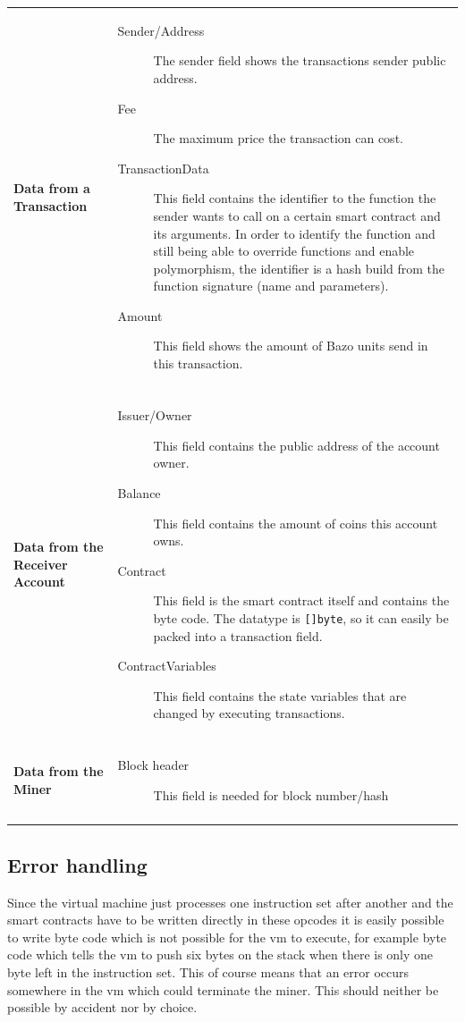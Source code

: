 \begin{tabular}[t]{ p{3cm} p{12.5cm}}
\raggedright
\textbf{Data from a Transaction} &
\begin{description}
  \item[Sender/Address] The sender field shows the transactions sender public address.
  \item[Fee] The maximum price the transaction can cost.
  \item[TransactionData] This field contains the identifier to the function the sender wants to call on a certain smart contract and its arguments. In order to identify the function and still being able to override functions and enable polymorphism, the identifier is a hash build from the function signature (name and parameters).
  \item[Amount] This field shows the amount of Bazo units send in this transaction.
\end{description} \\ \\

\raggedright
\textbf{Data from the Receiver Account} &
\begin{description}
  \item[Issuer/Owner] This field contains the public address of the account owner.
  \item[Balance] This field contains the amount of coins this account owns.
  \item[Contract] This field is the smart contract itself and contains the byte code. The datatype is \texttt{[]byte}, so it can easily be packed into a transaction field.
  \item[ContractVariables] This field contains the state variables that are changed by executing transactions.
\end{description} \\ \\

\raggedright
\textbf{Data from the Miner} &
\begin{description}
  \item[Block header] This field is needed for block number/hash
\end{description} \\ \\
\end{tabular}

\subsection{Error handling}
Since the virtual machine just processes one instruction set after another and the smart contracts have to be written directly in these opcodes it is easily possible to write byte code which is not possible for the vm to execute, for example byte code which tells the vm to push six bytes on the stack when there is only one byte left in the instruction set. This of course means that an error occurs somewhere in the vm which could terminate the miner. This should neither be possible by accident nor by choice.

